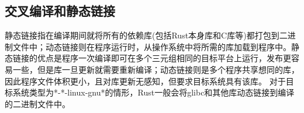 \documentclass[../../../dolphin-book-2023.tex]{subfiles}
\begin{document}
\subsection{交叉编译和静态链接}

静态链接指在编译期间就将所有的依赖库(包括Rust本身库和C库等)都打包到二进制文件中；动态链接则在程序运行时，从操作系统中将所需的库加载到程序中。静态链接的优点是程序一次编译即可在多个三元组相同的目标平台上运行，发布更容易一些，但是库一旦更新就需要重新编译；动态链接则是多个程序共享想同的库，因此程序文件体积更小，且对库更新无感知，但要求目标系统具有该库。 对于目标系统类型为*-*-linux-gnu*的情形，Rust一般会将glibc和其他库动态链接到编译的二进制文件中。
\end{document}
